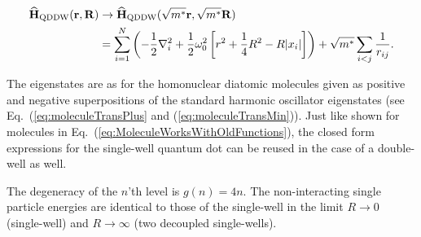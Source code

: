 \begin{align}
  {\bf\widehat{H}}_{\mathrm{QDDW}}(\mathbf{r}, \mathbf{R}) &\to {\bf\widehat{H}}_{\mathrm{QDDW}}(\sqrt{m^\ast}\mathbf{r}, \sqrt{m^\ast}\mathbf{R}) \\
   &=\sum_{i=1}^N \left(-\frac{1}{2}\nabla_i^2 + \frac{1}{2} \omega_0^2 \left[r^2 + \frac{1}{4}R^2 - R|x_i|\right]  \right) + \sqrt{m^\ast}\sum_{i<j} \frac{1}{r_{ij}}.
\end{align}

The eigenstates are as for the homonuclear diatomic molecules given as positive and negative superpositions of the standard harmonic oscillator eigenstates (see Eq.~(\ref{eq:moleculeTransPlus} and (\ref{eq:moleculeTransMin})). Just like shown for molecules in Eq.~(\ref{eq:MoleculeWorksWithOldFunctions}), the closed form expressions for the single-well quantum dot can be reused in the case of a double-well as well. 

The degeneracy of the $n$'th level is $g(n) = 4n$. The non-interacting single particle energies are identical to those of the single-well in the limit $R\to0$ (single-well) and $R\to\infty$ (two decoupled single-wells).

